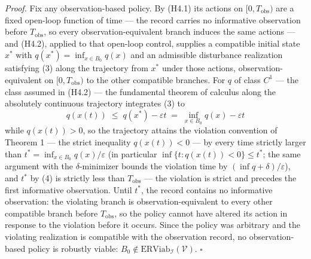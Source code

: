 \documentclass[11pt]{article}
\begin{document}
\emph{Proof.} Fix any observation-based policy. By (H4.1) its actions on
\([0, T_{\mathrm{obs}})\) are a fixed open-loop function of time --- the
record carries no informative observation before \(T_{\mathrm{obs}}\),
so every observation-equivalent branch induces the same actions --- and
(H4.2), applied to that open-loop control, supplies a compatible initial
state \(x^*\) with \(q(x^*) = \inf_{x \in B_0} q(x)\) and an admissible
disturbance realization satisfying (3) along the trajectory from \(x^*\)
under those actions, observation-equivalent on \([0, T_{\mathrm{obs}})\)
to the other compatible branches. For \(q\) of class \(C^1\) --- the
class assumed in (H4.2) --- the fundamental theorem of calculus along
the absolutely continuous trajectory integrates (3) to
\[q(x(t)) \;\le\; q(x^*) - \varepsilon t \;=\; \inf_{x \in B_0} q(x) - \varepsilon t\]
while \(q(x(t)) > 0\), so the trajectory attains the violation
convention of Theorem 1 --- the strict inequality \(q(x(t)) < 0\) --- by
every time strictly larger than
\(t^* = \inf_{x \in B_0} q(x) / \varepsilon\) (in particular
\(\inf\{ t : q(x(t)) < 0 \} \le t^*\); the same argument with the
\(\delta\)-minimizer bounds the violation time by
\((\inf q + \delta)/\varepsilon\)), and \(t^*\) by (4) is strictly less
than \(T_{\mathrm{obs}}\) --- the violation is strict and precedes the
first informative observation. Until \(t^*\), the record contains no
informative observation: the violating branch is observation-equivalent
to every other compatible branch before \(T_{\mathrm{obs}}\), so the
policy cannot have altered its action in response to the violation
before it occurs. Since the policy was arbitrary and the violating
realization is compatible with the observation record, no
observation-based policy is robustly viable:
\(B_0 \notin \mathrm{ERViab}_{\mathcal{I}}(\mathcal{V})\). \ensuremath{\square}
\end{document}
